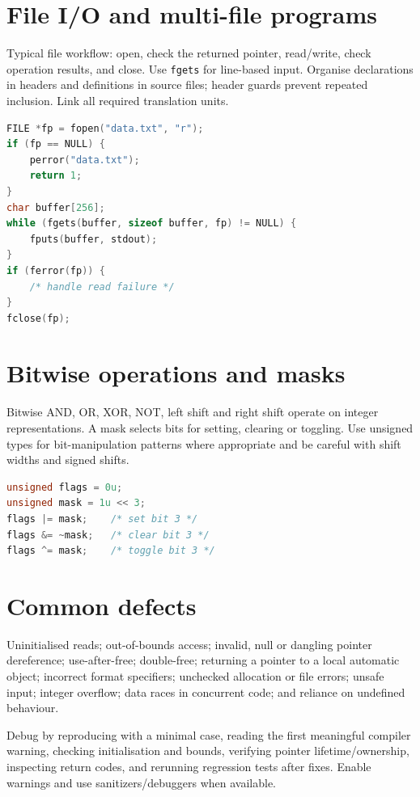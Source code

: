 \documentclass[11pt,a4paper]{article}
\begin{document}
\section{File I/O and multi-file programs}
Typical file workflow: open, check the returned pointer, read/write, check operation results, and close. Use \texttt{fgets} for line-based input. Organise declarations in headers and definitions in source files; header guards prevent repeated inclusion. Link all required translation units.
\begin{lstlisting}[language=C]
FILE *fp = fopen("data.txt", "r");
if (fp == NULL) {
    perror("data.txt");
    return 1;
}
char buffer[256];
while (fgets(buffer, sizeof buffer, fp) != NULL) {
    fputs(buffer, stdout);
}
if (ferror(fp)) {
    /* handle read failure */
}
fclose(fp);
\end{lstlisting}
\section{Bitwise operations and masks}
Bitwise AND, OR, XOR, NOT, left shift and right shift operate on integer representations. A mask selects bits for setting, clearing or toggling. Use unsigned types for bit-manipulation patterns where appropriate and be careful with shift widths and signed shifts.
\begin{lstlisting}[language=C]
unsigned flags = 0u;
unsigned mask = 1u << 3;
flags |= mask;    /* set bit 3 */
flags &= ~mask;   /* clear bit 3 */
flags ^= mask;    /* toggle bit 3 */
\end{lstlisting}
\section{Common defects}
\begin{warningBox}
Uninitialised reads; out-of-bounds access; invalid, null or dangling pointer dereference; use-after-free; double-free; returning a pointer to a local automatic object; incorrect format specifiers; unchecked allocation or file errors; unsafe input; integer overflow; data races in concurrent code; and reliance on undefined behaviour.
\end{warningBox}
Debug by reproducing with a minimal case, reading the first meaningful compiler warning, checking initialisation and bounds, verifying pointer lifetime/ownership, inspecting return codes, and rerunning regression tests after fixes. Enable warnings and use sanitizers/debuggers when available.
\end{document}
